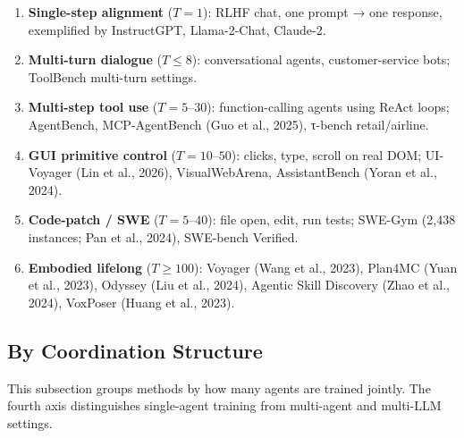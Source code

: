 \begin{enumerate}
\def\labelenumi{\arabic{enumi}.}
\tightlist
\item
  \textbf{Single-step alignment} (\(T=1\)): RLHF chat, one prompt → one response, exemplified by InstructGPT, Llama-2-Chat, Claude-2.
\item
  \textbf{Multi-turn dialogue} (\(T \le 8\)): conversational agents, customer-service bots; ToolBench multi-turn settings.
\item
  \textbf{Multi-step tool use} (\(T = 5\text{–}30\)): function-calling agents using ReAct loops; AgentBench, MCP-AgentBench (Guo et al., 2025), τ-bench retail/airline.
\item
  \textbf{GUI primitive control} (\(T = 10\text{–}50\)): clicks, type, scroll on real DOM; UI-Voyager (Lin et al., 2026), VisualWebArena, AssistantBench (Yoran et al., 2024).
\item
  \textbf{Code-patch / SWE} (\(T = 5\text{–}40\)): file open, edit, run tests; SWE-Gym (2,438 instances; Pan et al., 2024), SWE-bench Verified.
\item
  \textbf{Embodied lifelong} (\(T \ge 100\)): Voyager (Wang et al., 2023), Plan4MC (Yuan et al., 2023), Odyssey (Liu et al., 2024), Agentic Skill Discovery (Zhao et al., 2024), VoxPoser (Huang et al., 2023).
\end{enumerate}

\subsection{By Coordination Structure}\label{by-coordination-structure}

This subsection groups methods by how many agents are trained jointly. The fourth axis distinguishes single-agent training from multi-agent and multi-LLM settings.

